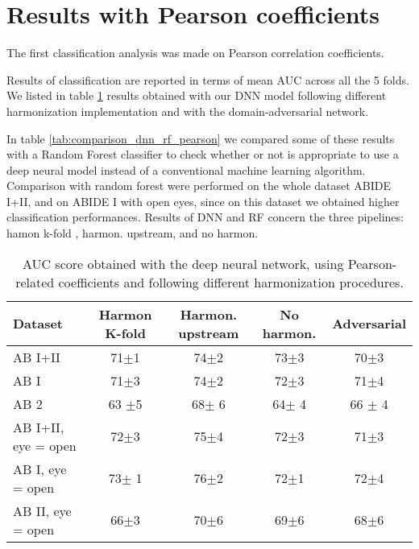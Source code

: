\documentclass[11pt]{report}
\begin{document}
\section{Results with Pearson coefficients}\label{sec:pearson_results}
The first classification analysis was made on Pearson correlation coefficients. 

Results of classification are reported in terms of mean AUC across all the 5 folds.
We listed in table \ref{tab:classification_pearson} results obtained with our DNN model following different harmonization implementation and with the domain-adversarial network.

In table \ref{tab:comparison_dnn_rf_pearson} we compared some of these results with a Random Forest classifier to check whether or not is appropriate to use a deep neural model instead of a conventional machine learning algorithm.
Comparison with random forest were performed on the whole dataset ABIDE I+II, and on ABIDE I with open eyes, since on this dataset we obtained higher classification performances. 
Results of DNN and RF concern the three pipelines: hamon k-fold , harmon. upstream, and no harmon.








\begin{table}[!htp]
\centering
\begin{tabular}{|lcccc|}
\hline
Dataset &Harmon K-fold &Harmon. upstream &No harmon. &Adversarial \\
\hline
AB I+II &71$\pm$1 &74$\pm$2 &73$\pm$3 &70$\pm$3 \\
AB I &71$\pm$3 &74$\pm$2 &72$\pm$3 &71$\pm$4 \\
AB 2 &63 $\pm$5 &68$\pm$ 6 &64$\pm$ 4 &66 $\pm$ 4 \\
AB I+II, eye = open &72$\pm$3 &75$\pm$4 &72$\pm$3 &71$\pm$3 \\
AB I, eye = open &73$\pm$ 1 &76$\pm$2 &72$\pm$1 &72$\pm$4 \\
AB II, eye = open  &66$\pm$3 &70$\pm$6 &69$\pm$6 &68$\pm$6 \\
\hline
\end{tabular}
\caption{AUC score obtained with the deep neural network, using Pearson-related coefficients and following different harmonization procedures.}
\label{tab:classification_pearson}
\end{table}
\end{document}
